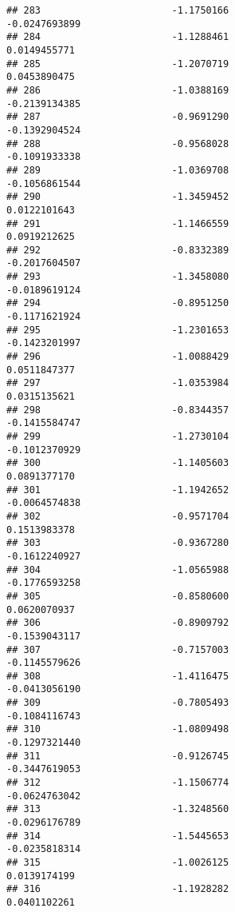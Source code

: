 \documentclass[
]{article}
\begin{document}
\begin{verbatim}
## 283                       -1.1750166                         -0.0247693899
## 284                       -1.1288461                          0.0149455771
## 285                       -1.2070719                          0.0453890475
## 286                       -1.0388169                         -0.2139134385
## 287                       -0.9691290                         -0.1392904524
## 288                       -0.9568028                         -0.1091933338
## 289                       -1.0369708                         -0.1056861544
## 290                       -1.3459452                          0.0122101643
## 291                       -1.1466559                          0.0919212625
## 292                       -0.8332389                         -0.2017604507
## 293                       -1.3458080                         -0.0189619124
## 294                       -0.8951250                         -0.1171621924
## 295                       -1.2301653                         -0.1423201997
## 296                       -1.0088429                          0.0511847377
## 297                       -1.0353984                          0.0315135621
## 298                       -0.8344357                         -0.1415584747
## 299                       -1.2730104                         -0.1012370929
## 300                       -1.1405603                          0.0891377170
## 301                       -1.1942652                         -0.0064574838
## 302                       -0.9571704                          0.1513983378
## 303                       -0.9367280                         -0.1612240927
## 304                       -1.0565988                         -0.1776593258
## 305                       -0.8580600                          0.0620070937
## 306                       -0.8909792                         -0.1539043117
## 307                       -0.7157003                         -0.1145579626
## 308                       -1.4116475                         -0.0413056190
## 309                       -0.7805493                         -0.1084116743
## 310                       -1.0809498                         -0.1297321440
## 311                       -0.9126745                         -0.3447619053
## 312                       -1.1506774                         -0.0624763042
## 313                       -1.3248560                         -0.0296176789
## 314                       -1.5445653                         -0.0235818314
## 315                       -1.0026125                          0.0139174199
## 316                       -1.1928282                          0.0401102261

\end{verbatim}
\end{document}
